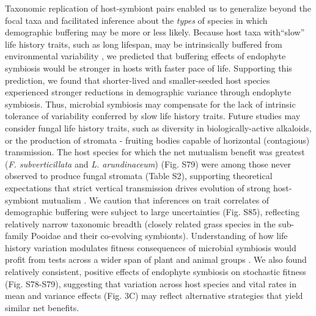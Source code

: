 \documentclass[lineno, sn-basic]{sn-jnl}%
\begin{document}
Taxonomic replication of host-symbiont pairs enabled us to generalize beyond the focal taxa and facilitated inference about the \emph{types} of species in which demographic buffering may be more or less likely. 
Because host taxa with``slow'' life history traits, such as long lifespan, may be intrinsically buffered from environmental variability \citep{rees1996evolutionary,moles2004seedling,morris2008longevity}, we predicted that buffering effects of endophyte symbiosis would be stronger in hosts with faster pace of life. 
Supporting this prediction, we found that shorter-lived and smaller-seeded host species experienced stronger reductions in demographic variance through endophyte symbiosis. 
Thus, microbial symbiosis may compensate for the lack of intrinsic tolerance of variability conferred by slow life history traits.
Future studies may consider fungal life history traits, such as diversity in biologically-active alkaloids, or the production of stromata - fruiting bodies capable of horizontal (contagious) transmission. 
The host species for which the net mutualism benefit was greatest (\emph{F. subverticillata} and \emph{L. arundinaceum}) (Fig. S79) were among those never observed to produce fungal stromata (Table S2), supporting theoretical expectations that strict vertical transmission drives evolution of strong host-symbiont mutualism \citep{fine1975vectors,afkhami2008symbiosis}. 
We caution that inferences on trait correlates of demographic buffering were subject to large uncertainties (Fig. S85), reflecting relatively narrow taxonomic breadth (closely related grass species in the sub-family Pooidae and their co-evolving symbionts).
Understanding of how life history variation modulates fitness consequences of microbial symbiosis would profit from tests across a wider span of plant and animal groups \citep{jeschke2009roles}. 
We also found relatively consistent, positive effects of endophyte symbiosis on stochastic fitness (Fig. S78-S79), suggesting that variation across host species and vital rates in mean and variance effects (Fig. 3C) may reflect alternative strategies that yield similar net benefits. 
\end{document}
